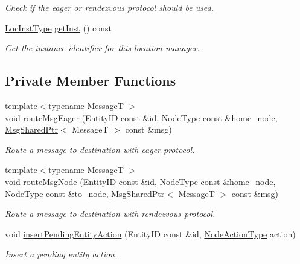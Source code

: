 \begin{DoxyCompactItemize}
\begin{DoxyCompactList}\small\item\em Check if the eager or rendezvous protocol should be used. \end{DoxyCompactList}\item 
\hyperlink{namespacevt_1_1location_a4db6456e8024af2d23fc5ae560fef866}{Loc\+Inst\+Type} \hyperlink{structvt_1_1location_1_1_entity_location_coord_abff79ccad9dcd168217f99ee97048beb}{get\+Inst} () const
\begin{DoxyCompactList}\small\item\em Get the instance identifier for this location manager. \end{DoxyCompactList}\end{DoxyCompactItemize}
\subsection*{Private Member Functions}
\begin{DoxyCompactItemize}
\item 
{\footnotesize template$<$typename MessageT $>$ }\\void \hyperlink{structvt_1_1location_1_1_entity_location_coord_ae44975ca70e81c8aa658fbbc9a3c619d}{route\+Msg\+Eager} (Entity\+ID const \&id, \hyperlink{namespacevt_a866da9d0efc19c0a1ce79e9e492f47e2}{Node\+Type} const \&home\+\_\+node, \hyperlink{namespacevt_ab2b3d506ec8e8d1540aede826d84a239}{Msg\+Shared\+Ptr}$<$ MessageT $>$ const \&msg)
\begin{DoxyCompactList}\small\item\em Route a message to destination with eager protocol. \end{DoxyCompactList}\item 
{\footnotesize template$<$typename MessageT $>$ }\\void \hyperlink{structvt_1_1location_1_1_entity_location_coord_a1fb91682d1695a98eed3375db9fa738e}{route\+Msg\+Node} (Entity\+ID const \&id, \hyperlink{namespacevt_a866da9d0efc19c0a1ce79e9e492f47e2}{Node\+Type} const \&home\+\_\+node, \hyperlink{namespacevt_a866da9d0efc19c0a1ce79e9e492f47e2}{Node\+Type} const \&to\+\_\+node, \hyperlink{namespacevt_ab2b3d506ec8e8d1540aede826d84a239}{Msg\+Shared\+Ptr}$<$ MessageT $>$ const \&msg)
\begin{DoxyCompactList}\small\item\em Route a message to destination with rendezvous protocol. \end{DoxyCompactList}\item 
void \hyperlink{structvt_1_1location_1_1_entity_location_coord_a2b2c69634e3ef42e2625541cd234b350}{insert\+Pending\+Entity\+Action} (Entity\+ID const \&id, \hyperlink{namespacevt_1_1location_a3a9235e0ceb341bef225d2cc46606e9e}{Node\+Action\+Type} action)
\begin{DoxyCompactList}\small\item\em Insert a pending entity action. \end{DoxyCompactList}\end{DoxyCompactItemize}
